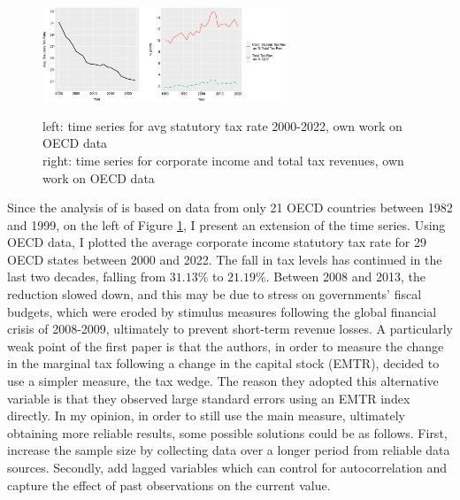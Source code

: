 \begin{figure}[!ht]
    \centering
    \captionsetup{font=footnotesize,justification=centering}\caption{left: time series for avg statutory tax rate 2000-2022, own work on OECD data\\right: time series for corporate income and total tax revenues, own work on OECD data}
    \includegraphics[width=0.65\textwidth]{img/stat-corp.jpg}
    \label{img:stat-revenues}
    \vspace{-5pt}
\end{figure}
Since the analysis of \textcite{dev-loc-red-08} is based on data from only 21 OECD countries between 1982 and 1999, on the left of Figure \ref{img:stat-revenues}, I present an extension of the time series. Using OECD data, I plotted the average corporate income statutory tax rate for 29 OECD states between 2000 and 2022. The fall in tax levels has continued in the last two decades, falling from $31.13\%$ to $21.19\%$. Between 2008 and 2013, the reduction slowed down, and this may be due to stress on governments' fiscal budgets, which were eroded by stimulus measures following the global financial crisis of 2008-2009, ultimately to prevent short-term revenue losses. A particularly weak point of the first paper is that the authors, in order to measure the change in the marginal tax following a change in the capital stock (EMTR), decided to use a simpler measure, the tax wedge. The reason they adopted this alternative variable is that they observed large standard errors using an EMTR index directly. In my opinion, in order to still use the main measure, ultimately obtaining more reliable results, some possible solutions could be as follows. First, increase the sample size by collecting data over a longer period from reliable data sources. Secondly, add lagged variables which can control for autocorrelation and capture the effect of past observations on the current value.

